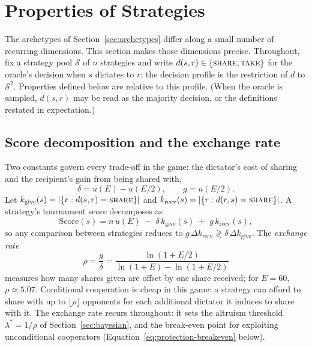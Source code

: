 \section{Properties of Strategies}
\label{sec:properties}

The archetypes of Section~\ref{sec:archetypes} differ along a small
number of recurring dimensions.
This section makes those dimensions precise.
Throughout, fix a strategy pool $\mathcal{S}$ of $n$ strategies and write
$d(s, r) \in \{\textup{\textsc{share}}, \textup{\textsc{take}}\}$ for
the oracle's decision when $s$ dictates to $r$; the decision profile
is the restriction of $d$ to $\mathcal{S}^2$.
Properties defined below are relative to this profile.
(When the oracle is sampled, $d(s,r)$ may be read as the majority
decision, or the definitions restated in expectation.)

\subsection{Score decomposition and the exchange rate}

Two constants govern every trade-off in the game:
the dictator's cost of sharing and the recipient's gain from being
shared with,
\begin{equation}
  \delta = u(E) - u(E/2), \qquad g = u(E/2).
  \label{eq:delta-g}
\end{equation}
Let $k_{\mathrm{give}}(s) = |\{r : d(s,r) = \textup{\textsc{share}}\}|$
and
$k_{\mathrm{recv}}(s) = |\{r : d(r,s) = \textup{\textsc{share}}\}|$.
A strategy's tournament score decomposes as
\begin{equation}
  \mathrm{Score}(s)
  = n\, u(E) \;-\; \delta\, k_{\mathrm{give}}(s)
  \;+\; g\, k_{\mathrm{recv}}(s),
  \label{eq:score-decomposition}
\end{equation}
so any comparison between strategies reduces to
$g\,\Delta k_{\mathrm{recv}} \gtrless \delta\,\Delta k_{\mathrm{give}}$.
The \emph{exchange rate}
\begin{equation}
  \rho = \frac{g}{\delta}
       = \frac{\ln(1 + E/2)}{\ln(1+E) - \ln(1 + E/2)}
  \label{eq:exchange-rate}
\end{equation}
measures how many shares given are offset by one share received;
for $E = 60$, $\rho \approx 5.07$.
Conditional cooperation is cheap in this game: a strategy can afford
to share with up to $\lfloor \rho \rfloor$ opponents for each
additional dictator it induces to share with it.
The exchange rate recurs throughout: it sets the altruism threshold
$\lambda^*= 1/\rho$ of Section~\ref{sec:bayesian}, and the
break-even point for exploiting unconditional cooperators
(Equation~\eqref{eq:protection-breakeven} below).

